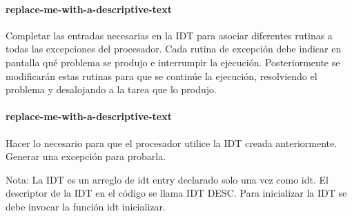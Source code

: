 \paragraph{replace-me-with-a-descriptive-text}\label{subsubsec:ej2-a}
Completar las entradas necesarias en la IDT para asociar diferentes rutinas a
todas las excepciones del procesador. Cada rutina de excepción debe indicar en
pantalla qué problema se produjo e interrumpir la ejecución. Posteriormente se
modificarán estas rutinas para que se continúe la ejecución, resolviendo el
problema y desalojando a la tarea que lo produjo.
\hruler
{}

\paragraph{replace-me-with-a-descriptive-text}\label{subsubsec:ej2-b}
Hacer lo necesario para que el procesador utilice la IDT creada anteriormente.
Generar una excepción para probarla.

Nota: La IDT es un arreglo de idt entry declarado solo una vez como idt. El
descriptor de la IDT en el código se llama IDT DESC. Para inicializar la IDT se
debe invocar la función idt inicializar.
\hruler
{}
